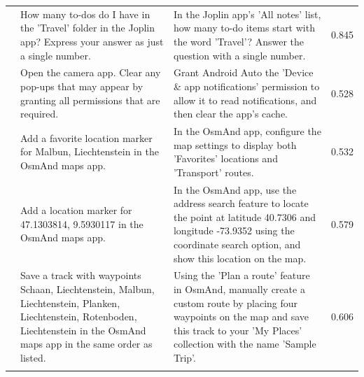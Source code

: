 \documentclass{article} %
\begin{document}
\begin{scriptsize}
\begin{longtable}{@{} c >{\raggedright\arraybackslash}p{} >{\raggedright\arraybackslash}p{} c @{}}
\addlinespace[2pt]
41 & How many to-dos do I have in the 'Travel' folder in the Joplin app? Express your answer as just a single number. & In the Joplin app's 'All notes' list, how many to-do items start with the word 'Travel'? Answer the question with a single number. & 0.845 \\
\addlinespace[2pt]
42 & Open the camera app. Clear any pop-ups that may appear by granting all permissions that are required. & Grant Android Auto the 'Device \& app notifications' permission to allow it to read notifications, and then clear the app's cache. & 0.528 \\
\addlinespace[2pt]
43 & Add a favorite location marker for Malbun, Liechtenstein in the OsmAnd maps app. & In the OsmAnd app, configure the map settings to display both 'Favorites' locations and 'Transport' routes. & 0.532 \\
\addlinespace[2pt]
44 & Add a location marker for 47.1303814, 9.5930117 in the OsmAnd maps app. & In the OsmAnd app, use the address search feature to locate the point at latitude 40.7306 and longitude -73.9352 using the coordinate search option, and show this location on the map. & 0.579 \\
\addlinespace[2pt]
45 & Save a track with waypoints Schaan, Liechtenstein, Malbun, Liechtenstein, Planken, Liechtenstein, Rotenboden, Liechtenstein in the OsmAnd maps app in the same order as listed. & Using the 'Plan a route' feature in OsmAnd, manually create a custom route by placing four waypoints on the map and save this track to your 'My Places' collection with the name 'Sample Trip'. & 0.606 \\
\addlinespace[2pt]

\end{longtable}
\end{scriptsize}
\end{document}
